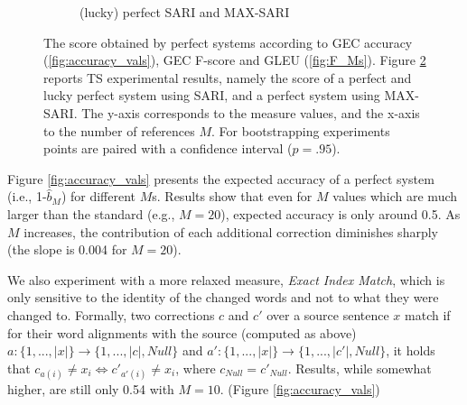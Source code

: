 \documentclass[11pt, a4paper]{article}
\begin{document}
\begin{figure}
\begin{subfigure}[]{0.65\columnwidth}
		\caption{
			(lucky) perfect SARI and MAX-SARI\label{fig:SARI_Ms}}
	\end{subfigure}
	\caption{The score obtained by perfect systems according to GEC accuracy (\ref{fig:accuracy_vals}), GEC F-score and GLEU (\ref{fig:F_Ms}).
        	Figure \ref{fig:SARI_Ms} reports TS experimental results, namely the score of a perfect and lucky perfect system using SARI,
        	and a perfect system using MAX-SARI. The y-axis corresponds to the measure values, and the x-axis to the number of references $M$.
        	For bootstrapping experiments points are paired with a confidence interval ($p=.95$).
	         }
\end{figure}

Figure \ref{fig:accuracy_vals} presents the expected accuracy of a perfect
system (i.e., 1-$\hat{b}_M$) for different  $M$s. 
Results show that even for $M$ values which are much larger than the standard (e.g., $M=20$),
expected accuracy is only around 0.5. As $M$ increases, the contribution of each additional correction 
diminishes sharply (the slope is 0.004 for $M=20$).

We also experiment with a more relaxed measure, {\it Exact Index Match}, which is only sensitive to the identity of the changed words and not to what they were changed to. 
Formally, two corrections $c$ and $c'$ over a source sentence $x$ match if for their word alignments with the source (computed as above) $a:\{1,...,\left|x\right|\} \rightarrow \{1,...,\left|c\right|,Null\}$
and $a':\{1,...,\left|x\right|\} \rightarrow \{1,...,\left|c'\right|,Null\}$, it holds that $c_{a\left(i\right)} \neq x_{i} \Leftrightarrow c'_{a'\left(i\right)} \neq x_{i}$, where $c_{Null}=c'_{Null}$.
Results, while somewhat higher, are still only 0.54 with $M=10$. (Figure \ref{fig:accuracy_vals})

\end{document}
